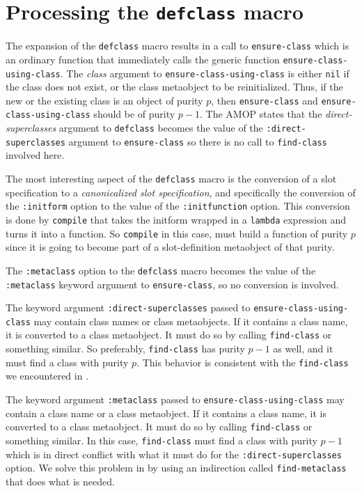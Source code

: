 \section{Processing the \texttt{defclass} macro}

The expansion of the \texttt{defclass} macro results in a call to
\texttt{ensure-class} which is an ordinary function that immediately
calls the generic function \texttt{ensure-class-using-class}.  The
\textit{class} argument to \texttt{ensure-class-using-class} is either
\texttt{nil} if the class does not exist, or the class metaobject to
be reinitialized.  Thus, if the new or the existing class is an object
of purity $p$, then \texttt{ensure-class} and
\texttt{ensure-class-using-class} should be of purity $p-1$.
The AMOP states that the \emph{direct-superclasses} argument to
\texttt{defclass} becomes the value of the
\texttt{:direct-superclasses} argument to \texttt{ensure-class} so
there is no call to \texttt{find-class} involved here.

The most interesting aspect of the \texttt{defclass} macro is the
conversion of a slot specification to a \emph{canonicalized slot
  specification}, and specifically the conversion of the
\texttt{:initform} option to the value of the \texttt{:initfunction}
option.  This conversion is done by \texttt{compile} that takes the
initform wrapped in a \texttt{lambda} expression and turns it into a
function.  So \texttt{compile} in this case, must build a function of
purity $p$ since it is going to become part of a slot-definition
metaobject of that purity.

The \texttt{:metaclass} option to the \texttt{defclass} macro becomes
the value of the \texttt{:metaclass} keyword argument to
\texttt{ensure-class}, so no conversion is involved.

The keyword argument \texttt{:direct-superclasses} passed to
\texttt{ensure-class-using-class} may contain class names or class
metaobjects.  If it contains a class name, it is converted to a class
metaobject.  It must do so by calling \texttt{find-class} or something
similar.  So preferably, \texttt{find-class} has purity $p-1$ as well,
and it must find a class with purity $p$.  This behavior is consistent
with the \texttt{find-class} we encountered in
.

The keyword argument \texttt{:metaclass} passed to
\texttt{ensure-class-using-class} may contain a class name or a class
metaobject.  If it contains a class name, it is converted to a class
metaobject.  It must do so by calling \texttt{find-class} or something
similar.  In this case, \texttt{find-class} must find a class with
purity $p-1$ which is in direct conflict with what it must do for the
\texttt{:direct-superclasses} option.  We solve this problem in
\sysname{} by using an indirection called \texttt{find-metaclass} that
does what is needed.

